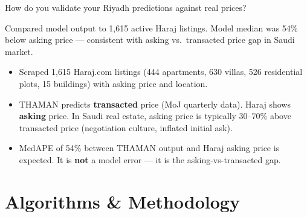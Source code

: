 \documentclass[11pt, a4paper, twoside]{article}
\begin{document}
\bigskip

\begin{question}{How do you validate your Riyadh predictions against real prices?}
\begin{shortanswer}
Compared model output to 1,615 active Haraj listings. Model median was 54\%
below asking price --- consistent with asking vs.\ transacted price gap in
Saudi market.
\end{shortanswer}

\begin{detail}
\begin{itemize}
  \item Scraped 1,615 Haraj.com listings (444 apartments, 630 villas, 526
        residential plots, 15 buildings) with asking price and location.
  \item THAMAN predicts \textbf{transacted} price (MoJ quarterly data). Haraj
        shows \textbf{asking} price. In Saudi real estate, asking price is
        typically 30--70\% above transacted price (negotiation culture,
        inflated initial ask).
  \item MedAPE of 54\% between THAMAN output and Haraj asking price is
        expected. It is \textbf{not} a model error --- it is the
        asking-vs-transacted gap.
\end{itemize}
\end{detail}
\end{question}

\section{Algorithms \& Methodology}
\label{sec:algo}
\end{document}
